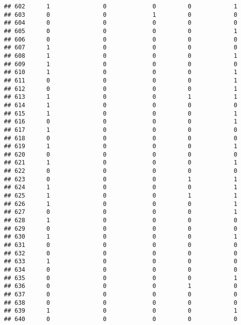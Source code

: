 \documentclass[]{article}
\begin{document}
\begin{verbatim}
## 602      1               0             0         0            1
## 603      0               0             1         0            0
## 604      0               0             0         0            0
## 605      0               0             0         0            1
## 606      0               0             0         0            0
## 607      1               0             0         0            0
## 608      1               0             0         0            1
## 609      1               0             0         0            0
## 610      1               0             0         0            1
## 611      0               0             0         0            1
## 612      0               0             0         0            1
## 613      1               0             0         1            1
## 614      1               0             0         0            0
## 615      1               0             0         0            1
## 616      0               0             0         0            1
## 617      1               0             0         0            0
## 618      0               0             0         0            0
## 619      1               0             0         0            1
## 620      0               0             0         0            0
## 621      1               0             0         0            1
## 622      0               0             0         0            0
## 623      0               0             0         1            1
## 624      1               0             0         0            1
## 625      1               0             0         1            1
## 626      1               0             0         0            1
## 627      0               0             0         0            1
## 628      1               0             0         0            0
## 629      0               0             0         0            0
## 630      1               0             0         0            1
## 631      0               0             0         0            0
## 632      0               0             0         0            0
## 633      1               0             0         0            0
## 634      0               0             0         0            0
## 635      0               0             0         0            1
## 636      0               0             0         1            0
## 637      0               0             0         0            0
## 638      0               0             0         0            0
## 639      1               0             0         0            1
## 640      0               0             0         0            0

\end{verbatim}
\end{document}
